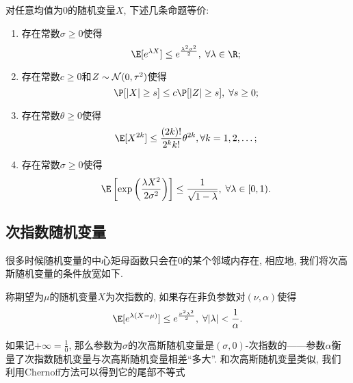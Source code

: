 \begin{theorem}[次高斯随机变量定义的等价性]
	对任意均值为$0$的随机变量$X$, 下述几条命题等价: 
	\begin{enumerate}[label=(\Roman*)]
		\item 存在常数$\sigma \geq 0$使得
			\begin{equation*}
				\E[e^{\lambda X} ] \leq e^{\frac{\lambda^2 \sigma^2}{2}},\; \forall \lambda \in \R; 
			\end{equation*}
		\item 存在常数$c \geq 0$和$Z \sim \mathcal{N}(0, \tau^2)$使得
			\begin{equation*}
				\P[|X| \geq s] \leq c \P[|Z| \geq s],\; \forall s \geq 0; 
			\end{equation*}
		\item 存在常数$\theta \geq 0$使得
			\begin{equation*}
				\E[X^{2k}] \leq \frac{(2k)!}{2^k k!} \theta^{2k}, \forall k = 1,2,\dots;
			\end{equation*}
		\item 存在常数$\sigma \geq 0$使得
			\begin{equation*}
				\E\left[ \exp\left(\frac{\lambda X^2}{2 \sigma^2}\right) \right] \leq \frac{1}{\sqrt{1 - \lambda}},\; \forall \lambda \in [0,1).
			\end{equation*}
	\end{enumerate}
\end{theorem}


\subsection{次指数随机变量}

很多时候随机变量的中心矩母函数只会在$0$的某个邻域内存在, 相应地, 我们将次高斯随机变量的条件放宽如下. 
\begin{definition}[次指数随机变量]
	称期望为$\mu$的随机变量$X$为次指数的, 如果存在非负参数对$(\nu, \alpha)$使得
	\begin{equation*}
		\E[ e^{\lambda(X - \mu)} ] 
		\leq e^{\frac{\nu^2 \lambda^2}{2}},\; 
		\forall |\lambda| < \frac{1}{\alpha}. 
	\end{equation*}
\end{definition}
\noindent
如果记$+\infty = \frac10$, 那么参数为$\sigma$的次高斯随机变量是$(\sigma, 0)$-次指数的——参数$\alpha$衡量了次指数随机变量与次高斯随机变量相差“多大”. 
和次高斯随机变量类似, 我们利用Chernoff方法可以得到它的尾部不等式

